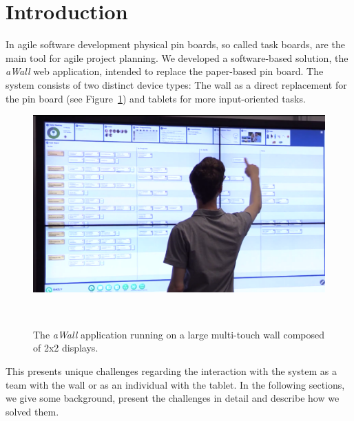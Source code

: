 \documentclass{sigchi}
\begin{document}



\section{Introduction}
In agile software development physical pin boards, so called task boards, are the main tool for agile project planning. We developed a software-based solution, the \textit{aWall} web application, intended to replace the paper-based pin board.
The system consists of two distinct device types: The wall as a direct replacement for the pin board (see Figure~\ref{fig:awall}) and tablets for more input-oriented tasks.

\begin{figure}[h]
	\centering
	\includegraphics[width=\columnwidth]{figures/awall}
	\caption{The \textit{aWall} application running on a large multi-touch wall composed of 2x2 displays.}
	~\label{fig:awall}
\end{figure}

This presents unique challenges regarding the interaction with the system as a team with the wall or as an individual with the tablet.
In the following sections, we give some background, present the challenges in detail and describe how we solved them.
\end{document}
